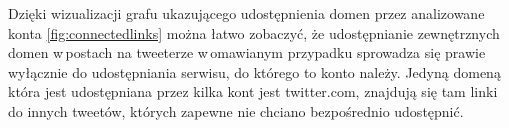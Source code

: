 Dzięki wizualizacji grafu ukazującego udostępnienia domen przez analizowane konta \ref{fig:connectedlinks} można łatwo zobaczyć, że udostępnianie zewnętrznych domen w\,postach na tweeterze w\,omawianym przypadku sprowadza się prawie wyłącznie do udostępniania serwisu, do którego to konto należy. Jedyną domeną która jest udostępniana przez kilka kont jest twitter.com, znajdują się tam linki do innych tweetów, których zapewne nie chciano bezpośrednio udostępnić. 